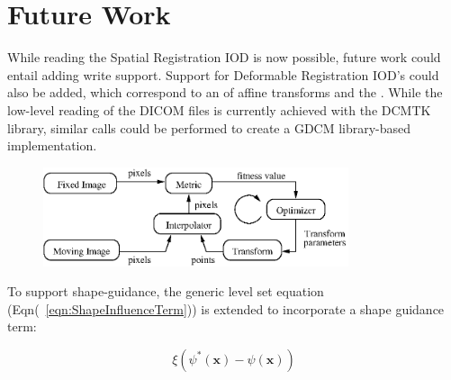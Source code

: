 \documentclass{InsightArticle}
\begin{document}

\section{Future Work}

While reading the Spatial Registration IOD is now possible, future work could
entail adding write support. Support for Deformable Registration IOD's could
also be added, which correspond to an  of affine
transforms and the .  While the low-level
reading of the DICOM files is currently achieved with the DCMTK library, similar
calls could be performed to create a GDCM library-based implementation.





%
%

\begin{figure}
\center
\includegraphics[width=0.8\textwidth]{RegistrationComponentsDiagram.eps}
\label{fig:RegistrationComponents}
\end{figure}



%
%


To support shape-guidance, the generic level set equation
(Eqn(~\ref{eqn:ShapeInfluenceTerm})) is extended to incorporate a shape guidance
term:

\begin{equation}
\label{eqn:ShapeInfluenceTerm}
\xi \left(\psi^{*}(\mathbf{x}) - \psi(\mathbf{x})\right)
\end{equation}




%
%



\end{document}
